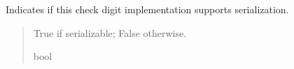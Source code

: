 \documentclass[letterpaper,10pt,english]{sphinxmanual}
\begin{document}
\begin{fulllineitems}
\begin{fulllineitems}
\begin{quote}
\begin{description}
\end{description}\end{quote}

\end{fulllineitems}


\begin{fulllineitems}
\label{\detokenize{apache_commons_validator_python.routines.checkdigit:id1}}
\pysigstartsignatures
{}
\pysigstopsignatures
\sphinxAtStartPar
Indicates if this check digit implementation supports serialization.
\begin{quote}\begin{description}
\sphinxAtStartPar
True if serializable; False otherwise.

\sphinxAtStartPar
bool

\end{description}\end{quote}

\end{fulllineitems}


\end{fulllineitems}
\end{document}
